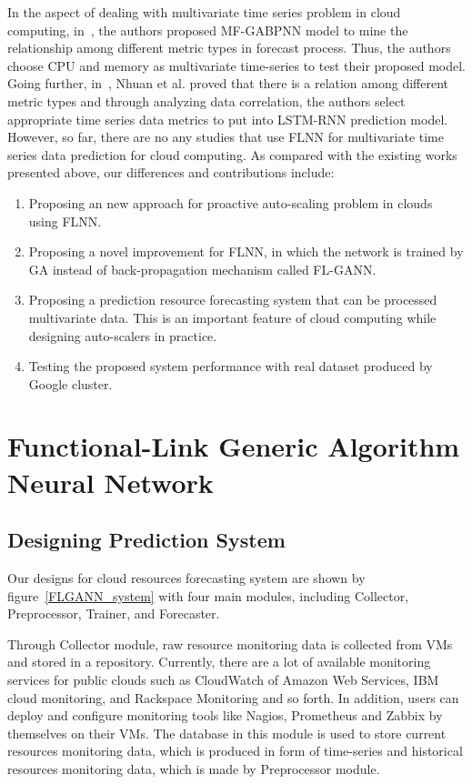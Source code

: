 \documentclass[conference]{IEEEtran}
\begin{document}
In the aspect of dealing with multivariate time series problem in cloud computing, in~\cite{ref_dang}, the authors proposed MF-GABPNN model to mine the relationship among different metric types in forecast process. Thus, the authors choose CPU and memory as multivariate time-series to test their proposed model. Going further, in~\cite{ref_nhuan}, Nhuan et al. proved that there is a relation among different metric types and through analyzing data correlation, the authors select appropriate time series data metrics to put into LSTM-RNN prediction model. However, so far, there are no any studies that use FLNN for multivariate time series data prediction for cloud computing. As compared with the existing works presented above, our differences and contributions include:

\begin{enumerate}
	\item Proposing an new approach for proactive auto-scaling problem in clouds using FLNN.
	\item Proposing a novel improvement for FLNN, in which the network is trained by GA instead of back-propagation mechanism called FL-GANN. 
	\item Proposing a prediction resource forecasting system that can be processed multivariate data. This is an important feature of cloud computing while designing auto-scalers in practice.
	\item Testing the proposed system performance with real dataset produced by Google cluster.
\end{enumerate}

\section{Functional-Link Generic Algorithm Neural Network}
\label{fl_gann}
\subsection{Designing Prediction System}
\label{designing_system}

Our designs for cloud resources forecasting system are shown by figure~\ref{FLGANN_system} with four main modules, including Collector, Preprocessor, Trainer, and Forecaster.

Through Collector module, raw resource monitoring data is collected from VMs and stored in a repository. Currently, there are a lot of available monitoring services for public clouds such as CloudWatch of Amazon Web Services, IBM cloud monitoring, and Rackspace Monitoring and so forth. In addition, users can deploy and configure monitoring tools like Nagios, Prometheus and Zabbix by themselves on their VMs. The database in this module is used to store current resources monitoring data, which is produced in form of time-series and historical resources monitoring data, which is made by Preprocessor module. 
\end{document}
